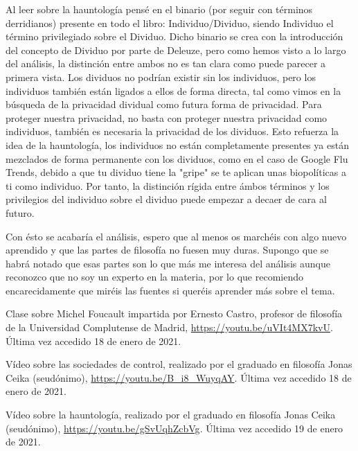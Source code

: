 \documentclass[11pt]{article}
\begin{document}
Al leer sobre la hauntología pensé en el binario (por seguir con términos derridianos) presente en todo el libro: Individuo/Dividuo, siendo Individuo el término privilegiado sobre el Dividuo. Dicho binario se crea con la introducción del concepto de Dividuo por parte de Deleuze, pero como hemos visto a lo largo del análisis, la distinción entre ambos no es tan clara como puede parecer a primera vista. Los dividuos no podrían existir sin los individuos, pero los individuos también están ligados a ellos de forma directa, tal como vimos en la búsqueda de la privacidad dividual como futura forma de privacidad. Para proteger nuestra privacidad, no basta con proteger nuestra privacidad como individuos, también es necesaria la privacidad de los dividuos. Esto refuerza la idea de la hauntología, los individuos no están completamente presentes ya están mezclados de forma permanente con los dividuos, como en el caso de Google Flu Trends, debido a que tu dividuo tiene la "gripe" se te aplican unas biopolíticas a ti como individuo. Por tanto, la distinción rígida entre ámbos términos y los privilegios del individuo sobre el dividuo puede empezar a decaer de cara al futuro.

Con ésto se acabaría el análisis, espero que al menos os marchéis con algo nuevo aprendido y que las partes de filosofía no fuesen muy duras. Supongo que se habrá notado que esas partes son lo que más me interesa del análisis aunque reconozco que no soy un experto en la materia, por lo que recomiendo encarecidamente que miréis las fuentes si queréis aprender más sobre el tema.
\begin{thebibliography}{8}
        Clase sobre Michel Foucault impartida por Ernesto Castro, profesor de filosofía de la Universidad Complutense de Madrid, \url{https://youtu.be/uVIt4MX7kvU}. Última vez accedido 18 de enero de 2021.

        Vídeo sobre las sociedades de control, realizado por el graduado en filosofía Jonas Ceika (seudónimo), \url{https://youtu.be/B_i8_WuyqAY}. Última vez accedido 18 de enero de 2021.

        Vídeo sobre la hauntología, realizado por el graduado en filosofía Jonas Ceika (seudónimo), \url{https://youtu.be/gSvUqhZcbVg}. Última vez accedido 19 de enero de 2021.
\end{thebibliography}
\end{document}
